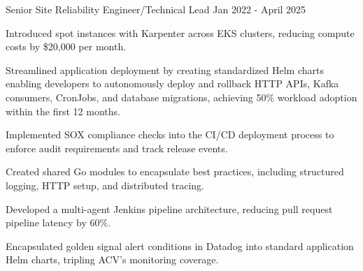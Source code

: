 \begin{cventries}
  \cventry
    {Senior Site Reliability Engineer/Technical Lead} %
    {} %
    {} %
    {Jan 2022 - April 2025} %
    {
      \begin{cvitems} %
        \item {Introduced spot instances with Karpenter across EKS clusters, reducing compute costs by \$20,000 per month.}
        \item {Streamlined application deployment by creating standardized Helm charts enabling developers to autonomously deploy and rollback HTTP APIs, Kafka consumers, CronJobs, and database migrations, achieving 50\% workload adoption within the first 12 months.}
        \item {Implemented SOX compliance checks into the CI/CD deployment process to enforce audit requirements and track release events.}
        \item {Created shared Go modules to encapsulate best practices, including structured logging, HTTP setup, and distributed tracing.}
        \item {Developed a multi-agent Jenkins pipeline architecture, reducing pull request pipeline latency by 60\%.}
        \item {Encapsulated golden signal alert conditions in Datadog into standard application Helm charts, tripling ACV's monitoring coverage.}
      \end{cvitems}
    }


\end{cventries}
